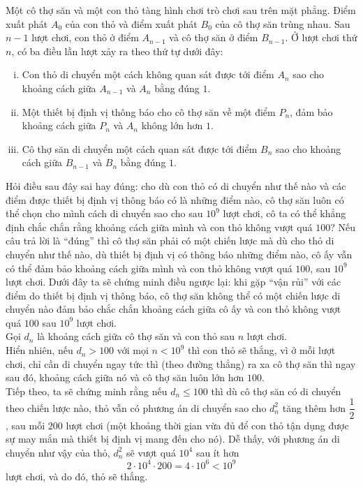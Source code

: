 \begin{bt}%
	Một cô thợ săn và một con thỏ tàng hình chơi trò chơi sau trên mặt phẳng. Điểm xuất phát $A_0$ của con thỏ và điểm xuất phát $B_0$ của cô thợ săn trùng nhau. Sau $n-1$ lượt chơi, con thỏ ở điểm $A_{n-1}$ và cô thợ săn ở điểm $B_{n-1}$. Ở lượt chơi thứ $n$, có ba điều lần lượt xảy ra theo thứ tự dưới đây:
	\begin{enumerate}[(i)]
		\item Con thỏ di chuyển một cách không quan sát được tới điểm $A_n$ sao cho khoảng cách giữa $A_{n-1}$ và $A_n$ bằng đúng $1$.
		\item Một thiết bị định vị thông báo cho cô thợ săn về một điểm $P_n$, đảm bảo khoảng cách giữa $P_n$ và $A_n$ không lớn hơn $1$.
		\item Cô thợ săn di chuyển một cách quan sát được tới điểm $B_n$ sao cho khoảng cách giữa $B_{n-1}$ và $B_n$ bằng đúng $1$.
	\end{enumerate}	
	Hỏi điều sau đây sai hay đúng: cho dù con thỏ có di chuyển như thế nào và các điểm được thiết bị định vị thông báo có là những điểm nào, cô thợ săn luôn có thể chọn cho mình cách di chuyển sao cho sau $10^9$ lượt chơi, cô ta có thể khẳng định chắc chắn rằng khoảng cách giữa mình và con thỏ không vượt quá $100$?
	\loigiai
	{
		Nếu câu trả lời là ``đúng'' thì cô thợ săn phải có một chiến lược mà dù cho thỏ di chuyển như thế nào, dù thiết bị định vị có thông báo những điểm nào, cô ấy vẫn có thể đảm bảo khoảng cách giữa mình và con thỏ không vượt quá $100$, sau $10^9$ lượt chơi. Dưới đây ta sẽ chứng minh điều ngược lại: khi gặp ``vận rủi'' với các điểm do thiết bị định vị thông báo, cô thợ săn không thể có một chiến lược di chuyển nào đảm bảo chắc chắn khoảng cách giữa cô ấy và con thỏ không vượt quá $100$ sau $10^9$ lượt chơi.\\
		Gọi $d_n$ là khoảng cách giữa cô thợ săn và con thỏ sau $n$ lượt chơi.\\
		Hiển nhiên, nếu $d_n>100$ với mọi $n<10^9$ thì con thỏ sẽ thắng, vì ở mỗi lượt chơi, chỉ cần di chuyển ngay tức thì (theo đường thẳng) ra xa cô thợ săn thì ngay sau đó, khoảng cách giữa nó và cô thợ săn luôn lớn hơn $100$.\\
		Tiếp theo, ta sẽ chứng minh rằng nếu $d_n\le 100$ thì dù cô thợ săn có di chuyển theo chiến lược nào, thỏ vẫn có phương án di chuyển sao cho $d_n^2$ tăng thêm hơn $\dfrac{1}{2}$, sau mỗi $200$ lượt chơi (một khoảng thời gian vừa đủ để con thỏ tận dụng được sự may mắn mà thiết bị định vị mang đến cho nó). Dễ thấy, với phương án di chuyển như vậy của thỏ, $d_n^2$ sẽ vượt quá $10^4$ sau ít hơn $$2\cdot 10^4\cdot 200=4\cdot 10^6<10^9$$ lượt chơi, và do đó, thỏ sẽ thắng.\\
}
\end{bt}
